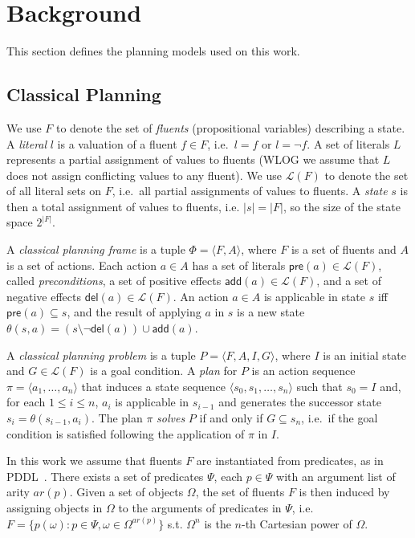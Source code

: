 \documentclass[letterpaper]{article} %
\newcommand{\tup}[1]{{\langle #1 \rangle}}
\newcommand{\pre}{\mathsf{pre}}     %
\newcommand{\del}{\mathsf{del}}     %
\newcommand{\add}{\mathsf{add}}     %
\begin{document}
\section{Background}
This section defines the planning models used on this work.

\subsection{Classical Planning}
We use $F$ to denote the set of {\em fluents} (propositional variables) describing a state. A {\em literal} $l$ is a valuation of a fluent $f\in F$, i.e.~$l=f$ or $l=\neg f$. A set of literals $L$ represents a partial assignment of values to fluents (WLOG we assume that $L$ does not assign conflicting values to any fluent). We use $\mathcal{L}(F)$ to denote the set of all literal sets on $F$, i.e.~all partial assignments of values to fluents. A {\em state} $s$ is then a total assignment of values to fluents, i.e. $|s|=|F|$, so the size of the state space $2^{|F|}$. 

A {\em classical planning frame} is a tuple $\Phi=\tup{F,A}$, where $F$ is a set of fluents and $A$ is a set of actions. Each action $a\in A$ has a set of literals $\pre(a)\in\mathcal{L}(F)$, called {\em preconditions}, a set of positive effects $\add(a)\in\mathcal{L}(F)$, and a set of negative effects $\del(a)\in\mathcal{L}(F)$. An action $a\in A$ is applicable in state $s$ iff $\pre(a)\subseteq s$, and the result of applying $a$ in $s$ is a new state $\theta(s,a)=(s\setminus \neg\del(a))\cup\add(a)$.

A {\em classical planning problem} is a tuple $P=\tup{F,A,I,G}$, where $I$ is an initial state and $G\in\mathcal{L}(F)$ is a goal condition. A {\em plan} for $P$ is an action sequence $\pi=\tup{a_1, \ldots, a_n}$ that induces a state sequence $\tup{s_0, s_1, \ldots, s_n}$ such that $s_0=I$ and, for each {\small $1\leq i\leq n$}, $a_i$ is applicable in $s_{i-1}$ and generates the successor state $s_i=\theta(s_{i-1},a_i)$. The plan $\pi$ {\em solves} $P$ if and only if $G\subseteq s_n$, i.e.~if the goal condition is satisfied following the application of $\pi$ in $I$.

In this work we assume that fluents $F$ are instantiated from predicates, as in PDDL~\cite{fox2003pddl2}. There exists a set of predicates $\Psi$, each $p\in\Psi$ with an argument list of arity $ar(p)$. Given a set of objects $\Omega$, the set of fluents $F$ is then induced by assigning objects in $\Omega$ to the arguments of predicates in $\Psi$, i.e.~$F=\{p(\omega):p\in\Psi,\omega\in\Omega^{ar(p)}\}$ s.t. $\Omega^n$ is the $n$-th Cartesian power of $\Omega$.
\end{document}
